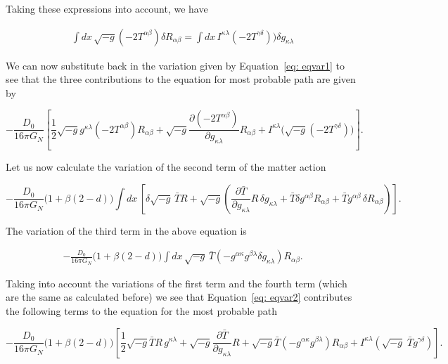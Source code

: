 \documentclass[aps,preprintnumbers,superscriptaddress,longbibliography]{revtex4-1}
\begin{document}
Taking these expressions into account, we have

\begin{eqnarray}
\int  dx\, \sqrt{-g}(-2T^{\alpha \beta})\delta R_{\alpha \beta} =\int  dx\, I^{\kappa \lambda}(-2T^{\gamma \delta}))\delta g_{\kappa \lambda}
\end{eqnarray}

We can now substitute back in the variation given by Equation~\eqref{eq: eqvar1} to see that the three contributions to the equation for most probable path are given by

\begin{equation}
-\frac{D_0}{16 \pi G_{N}}\left[\frac{1}{2}\sqrt{-g}g^{\kappa \lambda}(-2T^{\alpha \beta})R_{\alpha \beta}+\sqrt{-g}\frac{\partial (-2T^{\alpha \beta})}{\partial g_{\kappa \lambda}}R_{\alpha \beta}+I^{\kappa \lambda}\big(\sqrt{-g}(-2T^{\gamma \delta})\big)\right].
\end{equation}

Let us now calculate the variation of the second term of the matter action

\begin{equation}
\label{eq: eqvar2}
-\frac{D_0}{16 \pi G_{N}}\big(1+\beta(2-d)\big)\int  dx\, \left[\delta \sqrt{-g}\,\bar{T}R+\sqrt{-g}\left(\frac{\partial \bar{T}}{\partial g_{\kappa \lambda}}R\,\delta g_{\kappa \lambda}+\bar{T}\delta g^{\alpha \beta} R_{\alpha \beta}+\bar{T} g^{\alpha\beta}\,\delta R_{\alpha \beta}\right)\right].
\end{equation}


The variation of the third term in the above equation is

\begin{eqnarray}
\label{eqvar2}
-\frac{D_0}{16 \pi G_{N}}\big(1+\beta(2-d)\big)\int dx\, \sqrt{-g}\,\bar{T}(-g^{\alpha \kappa}g^{\beta \lambda}\delta g_{\kappa \lambda}) R_{\alpha \beta}.
\end{eqnarray}

Taking into account the variations of the first term and the fourth term (which are the same as calculated before) we see that Equation~\eqref{eq: eqvar2} contributes the following terms to the equation for the most probable path

\begin{equation}
-\frac{D_0}{16 \pi G_{N}}\big(1+\beta(2-d)\big) \left[\frac{1}{2}\sqrt{-g}\bar{T}R\, g^{\kappa \lambda}+\sqrt{-g}\frac{\partial \bar{T}}{\partial g_{\kappa \lambda}}R+\sqrt{-g}\bar{T}(-g^{\alpha \kappa}g^{\beta \lambda}) R_{\alpha \beta}+I^{\kappa \lambda}(\sqrt{-g}\;\bar{T} g^{\gamma \delta})\right].
\end{equation}
\end{document}
